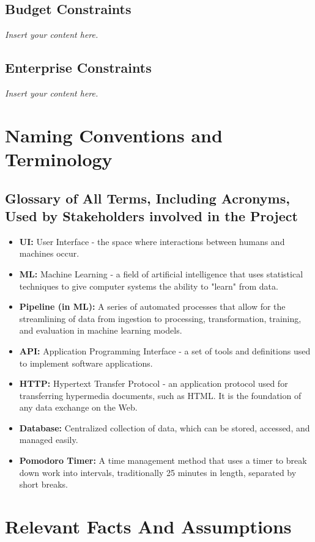 \documentclass[12pt]{article}
\newcommand{\lips}{\textit{Insert your content here.}}
\begin{document}
\subsection{Budget Constraints}
\lips
\subsection{Enterprise Constraints}
\lips

\section{Naming Conventions and Terminology}
\subsection{Glossary of All Terms, Including Acronyms, Used by Stakeholders involved in the Project}
\begin{itemize}
    \item \textbf{UI:} User Interface - the space where interactions between humans and machines occur.
    \item \textbf{ML:} Machine Learning - a field of artificial intelligence that uses statistical techniques to give computer systems the ability to "learn" from data.
    \item \textbf{Pipeline (in ML):} A series of automated processes that allow for the streamlining of data from ingestion to processing, transformation, training, and evaluation in machine learning models.
    \item \textbf{API:} Application Programming Interface - a set of tools and definitions used to implement software applications.
    \item \textbf{HTTP:} Hypertext Transfer Protocol - an application protocol used for transferring hypermedia documents, such as HTML. It is the foundation of any data exchange on the Web.
    \item \textbf{Database:} Centralized collection of data, which can be stored, accessed, and managed easily.
    \item \textbf{Pomodoro Timer:} A time management method that uses a timer to break down work into intervals, traditionally 25 minutes in length, separated by short breaks.
\end{itemize}


\section{Relevant Facts And Assumptions}
\end{document}
